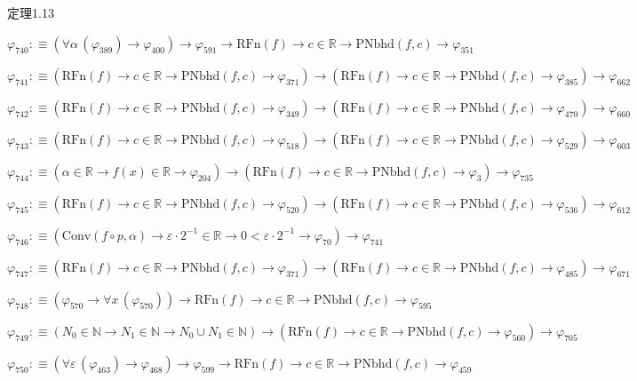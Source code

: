 \begin{fullproof}{定理1.13}
\begin{abbrevlist}
\item $\varphi_{740} :\equiv (\forall \alpha\,(\varphi_{389}) \to \varphi_{400}) \to \varphi_{591} \to \mathrm{RFn}(f) \to c \in \mathbb{R} \to \mathrm{PNbhd}(f,c) \to \varphi_{351}$
\item $\varphi_{741} :\equiv (\mathrm{RFn}(f) \to c \in \mathbb{R} \to \mathrm{PNbhd}(f,c) \to \varphi_{371}) \to (\mathrm{RFn}(f) \to c \in \mathbb{R} \to \mathrm{PNbhd}(f,c) \to \varphi_{385}) \to \varphi_{662}$
\item $\varphi_{742} :\equiv (\mathrm{RFn}(f) \to c \in \mathbb{R} \to \mathrm{PNbhd}(f,c) \to \varphi_{349}) \to (\mathrm{RFn}(f) \to c \in \mathbb{R} \to \mathrm{PNbhd}(f,c) \to \varphi_{470}) \to \varphi_{660}$
\item $\varphi_{743} :\equiv (\mathrm{RFn}(f) \to c \in \mathbb{R} \to \mathrm{PNbhd}(f,c) \to \varphi_{518}) \to (\mathrm{RFn}(f) \to c \in \mathbb{R} \to \mathrm{PNbhd}(f,c) \to \varphi_{529}) \to \varphi_{603}$
\item $\varphi_{744} :\equiv (\alpha \in \mathbb{R} \to f(x) \in \mathbb{R} \to \varphi_{204}) \to (\mathrm{RFn}(f) \to c \in \mathbb{R} \to \mathrm{PNbhd}(f,c) \to \varphi_{3}) \to \varphi_{735}$
\item $\varphi_{745} :\equiv (\mathrm{RFn}(f) \to c \in \mathbb{R} \to \mathrm{PNbhd}(f,c) \to \varphi_{520}) \to (\mathrm{RFn}(f) \to c \in \mathbb{R} \to \mathrm{PNbhd}(f,c) \to \varphi_{536}) \to \varphi_{612}$
\item $\varphi_{746} :\equiv (\mathrm{Conv}(f \circ p,\alpha) \to \varepsilon \cdot 2^{-1} \in \mathbb{R} \to 0 < \varepsilon \cdot 2^{-1} \to \varphi_{70}) \to \varphi_{741}$
\item $\varphi_{747} :\equiv (\mathrm{RFn}(f) \to c \in \mathbb{R} \to \mathrm{PNbhd}(f,c) \to \varphi_{371}) \to (\mathrm{RFn}(f) \to c \in \mathbb{R} \to \mathrm{PNbhd}(f,c) \to \varphi_{485}) \to \varphi_{671}$
\item $\varphi_{748} :\equiv (\varphi_{570} \to \forall x\,(\varphi_{570})) \to \mathrm{RFn}(f) \to c \in \mathbb{R} \to \mathrm{PNbhd}(f,c) \to \varphi_{595}$
\item $\varphi_{749} :\equiv (N_{0} \in \mathbb{N} \to N_{1} \in \mathbb{N} \to N_{0} \cup N_{1} \in \mathbb{N}) \to (\mathrm{RFn}(f) \to c \in \mathbb{R} \to \mathrm{PNbhd}(f,c) \to \varphi_{560}) \to \varphi_{705}$
\item $\varphi_{750} :\equiv (\forall \varepsilon\,(\varphi_{463}) \to \varphi_{468}) \to \varphi_{599} \to \mathrm{RFn}(f) \to c \in \mathbb{R} \to \mathrm{PNbhd}(f,c) \to \varphi_{459}$

\end{abbrevlist}
\end{fullproof}
